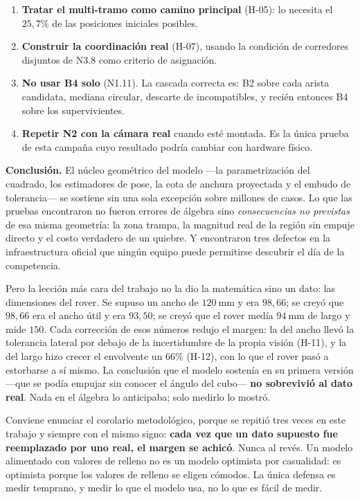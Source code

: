\documentclass[11pt,a4paper]{article}
\begin{document}
\begin{enumerate}[label=\textbf{\arabic*.},leftmargin=2.6em,itemsep=6pt]
\item \textbf{Tratar el multi-tramo como camino principal} (H-05): lo necesita el
      $25{,}7\%$ de las posiciones iniciales posibles.

\item \textbf{Construir la coordinación real} (H-07), usando la condición de corredores
      disjuntos de N3.8 como criterio de asignación.

\item \textbf{No usar B4 solo} (N1.11). La cascada correcta es: B2 sobre cada arista
      candidata, mediana circular, descarte de incompatibles, y recién entonces B4 sobre
      los supervivientes.

\item \textbf{Repetir N2 con la cámara real} cuando esté montada. Es la única prueba de
      esta campaña cuyo resultado podría cambiar con hardware físico.
\end{enumerate}

\begin{tcolorbox}[colback=black!3,colframe=black!55,boxrule=0.6pt,arc=1pt]
\textbf{Conclusión.} El núcleo geométrico del modelo ---la parametrización del cuadrado,
los estimadores de pose, la cota de anchura proyectada y el embudo de tolerancia--- se
sostiene sin una sola excepción sobre millones de casos. Lo que las pruebas encontraron
no fueron errores de álgebra sino \emph{consecuencias no previstas} de esa misma
geometría: la zona trampa, la magnitud real de la región sin empuje directo y el costo
verdadero de un quiebre. Y encontraron tres defectos en la infraestructura oficial que
ningún equipo puede permitirse descubrir el día de la competencia.

\medskip
Pero la lección más cara del trabajo no la dio la matemática sino un dato: las dimensiones
del rover. Se supuso un ancho de $120\ \mathrm{mm}$ y era $98{,}66$; se creyó que $98{,}66$
era el ancho útil y era $93{,}50$; se creyó que el rover medía $94\ \mathrm{mm}$ de largo
y mide $150$. Cada corrección de esos números redujo el margen: la del ancho llevó la
tolerancia lateral por debajo de la incertidumbre de la propia visión (H-11), y la del
largo hizo crecer el envolvente un $66\%$ (H-12), con lo que el rover pasó a estorbarse a
sí mismo. La conclusión que el modelo sostenía en su primera versión ---que se podía
empujar sin conocer el ángulo del cubo--- \textbf{no sobrevivió al dato real}. Nada en el
álgebra lo anticipaba; solo medirlo lo mostró.

\medskip
Conviene enunciar el corolario metodológico, porque se repitió tres veces en este trabajo
y siempre con el mismo signo: \textbf{cada vez que un dato supuesto fue reemplazado por
uno real, el margen se achicó}. Nunca al revés. Un modelo alimentado con valores de
relleno no es un modelo optimista por casualidad: es optimista porque los valores de
relleno se eligen cómodos. La única defensa es medir temprano, y medir lo que el modelo
usa, no lo que es fácil de medir.
\end{tcolorbox}
\end{document}
